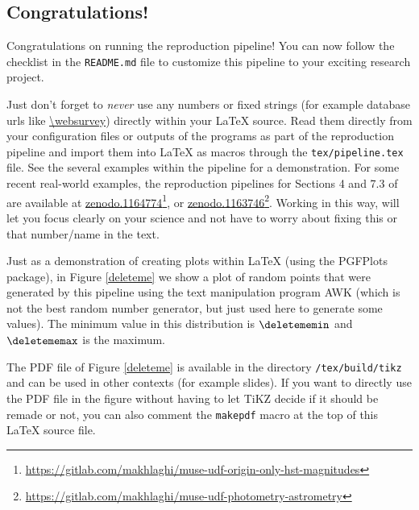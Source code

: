 \documentclass{article}
\begin{document}
\maketitle

\begin{multicols}{2}

\section{Congratulations!}
Congratulations on running the reproduction pipeline! You can now follow
the checklist in the \texttt{README.md} file to customize this pipeline to
your exciting research project.

Just don't forget to \emph{never} use any numbers or fixed strings (for
example database urls like \url{\websurvey}) directly within your \LaTeX{}
source. Read them directly from your configuration files or outputs of the
programs as part of the reproduction pipeline and import them into \LaTeX{}
as macros through the \texttt{tex/pipeline.tex} file. See the several
examples within the pipeline for a demonstration. For some recent
real-world examples, the reproduction pipelines for Sections 4 and 7.3 of
\citet{bacon17} are available at
\href{https://doi.org/10.5281/zenodo.1164774}{zenodo.1164774}\footnote{\url{https://gitlab.com/makhlaghi/muse-udf-origin-only-hst-magnitudes}},
or
\href{https://doi.org/10.5281/zenodo.1163746}{zenodo.1163746}\footnote{\url{https://gitlab.com/makhlaghi/muse-udf-photometry-astrometry}}. Working
in this way, will let you focus clearly on your science and not have to
worry about fixing this or that number/name in the text.

Just as a demonstration of creating plots within \LaTeX{} (using the
PGFPlots package), in Figure \ref{deleteme} we show a plot of
\deletemenum{} random points that were generated by this pipeline using the
text manipulation program {\small AWK} (which is not the best random number
generator, but just used here to generate some values). The minimum value
in this distribution is $\deletememin$ and $\deletememax$ is the maximum.

The {\small PDF} file of Figure \ref{deleteme} is available in the
directory \texttt{\bdir/tex/build/tikz} and can be used in other contexts
(for example slides). If you want to directly use the PDF file in the
figure without having to let TiKZ decide if it should be remade or not, you
can also comment the \texttt{makepdf} macro at the top of this \LaTeX{}
source file.


\end{multicols}
\end{document}
